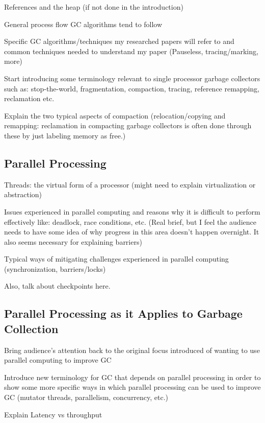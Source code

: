 \documentclass{sig-alternate}
\begin{document}
References and the heap (if not done in the introduction)

General process flow GC algorithms tend to follow

Specific GC algorithms/techniques my researched papers will 
refer to and common techniques needed to understand my paper 
(Pauseless, tracing/marking, more)

Start introducing some terminology relevant to single processor 
garbage collectors such as: stop-the-world, fragmentation, compaction, 
tracing, reference remapping, reclamation etc.

Explain the two typical aspects of compaction 
(relocation/copying and remapping: 
reclamation in compacting garbage collectors is often done through these
by just labeling memory as free.)

\subsection{Parallel Processing}
\label{sec:parallelProcessing}

Threads: the virtual form of a processor (might need to 
explain virtualization or abstraction)

Issues experienced in parallel computing and reasons why it 
is difficult to perform effectively like: deadlock, race conditions, 
etc. (Real brief, but I feel the audience needs to have some idea of 
why progress in this area doesn't happen overnight. It also seems 
necessary for explaining barriers)

Typical ways of mitigating challenges experienced in parallel 
computing (synchronization, barriers/locks)

Also, talk about checkpoints here.

\subsection{Parallel Processing as it Applies to Garbage Collection}
\label{sec:parallelProcessingGarbageCollection}

Bring audience's attention back to the original focus introduced 
of wanting to use parallel computing to improve GC

Introduce new terminology for GC that depends on parallel processing 
in order to show some more specific ways in which parallel processing 
can be used to improve GC (mutator threads, parallelism, concurrency, etc.)

Explain Latency vs throughput
\end{document}
